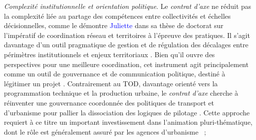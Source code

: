 \begin{refsegment}
\begin{customitemize}
\item \textsl{Complexité institutionnelle et orientation politique}. Le \textsl{contrat d’axe} ne réduit pas la complexité liée au partage des compétences entre collectivités et échelles décisionnelles, comme le démontre \textcolor{blue}{Juliette} \textcolor{blue}{\textcite[469]{maulat_coordonner_2014}} dans sa thèse de doctorat sur l'impératif de coordination réseau et territoires à l'épreuve des pratiques. Il s’agit davantage d’un outil pragmatique de gestion et de régulation des décalages entre périmètres institutionnels et enjeux territoriaux \textcolor{blue}{\autocite[96]{maulat_contractualiser_2015}}. Bien qu’il ouvre des perspectives pour une meilleure coordination, cet instrument agit principalement comme un outil de gouvernance et de communication politique, destiné à légitimer un projet \textcolor{blue}{\autocite[84]{gachon_impact_2019}}. Contrairement au \acrshort{TOD}, davantage orienté vers la programmation technique et la production urbaine, le \textsl{contrat d’axe} cherche à réinventer une gouvernance coordonnée des politiques de transport et d’urbanisme pour pallier la dissociation des logiques de pilotage \textcolor{blue}{\autocites[118]{bentayou_contrat_2015}[20]{afoun_mostaganem_2022}}. Cette approche requiert à ce titre un important investissement dans l'animation pluri-thématique, dont le rôle est généralement assuré par les agences d'urbanisme \textcolor{blue}{\autocite[2]{cerema_outils_2021}}~;

\end{customitemize}
\end{refsegment}
